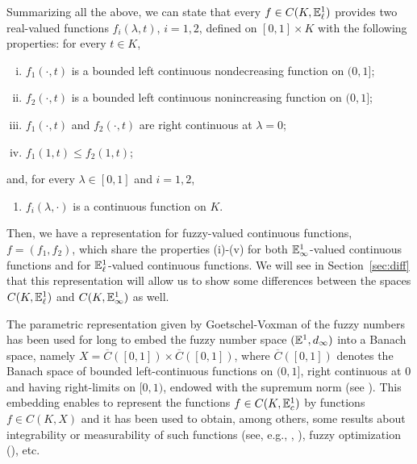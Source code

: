 \documentclass{amsart}
\newcommand{\R}{{\mathbb{R}}}
\newcommand{\fn}{\mathbb{E}\sp{1}}
\begin{document}
 Summarizing all the above,  we can state that  every $f\in C(K, \fn_{\ell})$
  provides two real-valued functions $f_i(\lambda,t)$, $i=1,2$, defined on $[0,1]\times K$ with the following properties:
 for every $t\in K$,

\begin{enumerate}[(i)]
 \item $f_1(\cdot,t)$ is a bounded left continuous nondecreasing function
on $\mathopen (0,1\mathclose]$;

\item  $f_2(\cdot,t)$ is a bounded left continuous nonincreasing function
on $\mathopen (0,1\mathclose]$;

\item $f_1(\cdot,t)$ and $f_2(\cdot,t)$ are right continuous at
$\lambda=0$;

\item $f_1(1,t)\leq f_2(1,t)$;
\end{enumerate}
and, for every $\lambda\in[0,1]$ and $i=1,2$,
\begin{enumerate}
\item[(v)] $f_i(\lambda,\cdot)$ is a continuous function on $K$.

\end{enumerate}

Then, we have a representation for fuzzy-valued continuous functions, $f=(f_1,f_2)$, which share the properties (i)-(v) for both
$\fn_{\infty}$-valued continuous functions and for $\fn_{\ell}$-valued continuous functions.
We will see in Section~\ref{sec:diff} that this representation will allow us to show some differences between the spaces $C(K, \fn_{\ell})$ and $ C(K,\fn_{\infty})$ as well.


The parametric representation given by Goetschel-Voxman of the fuzzy numbers has been used for long to embed the fuzzy number space $(\fn,d_{\infty})$ into a Banach space, namely $X=\overline{C}([0,1])\times \overline{C}([0,1])$, where $\overline{C}([0,1])$ denotes the Banach space of bounded left-continuous functions on $(0,1]$, right continuous at $0$ and having right-limits on $[0,1)$, endowed with the supremum norm (see \cite{WuMa:91}). This embedding enables to represent the functions $ f\in C(K, \fn_{c})$ by functions $f\in C(K,X)$ and it has been used to obtain, among others, some results about integrability or measurability of such functions
(see, e.g., \cite{WuMa:92-1}, \cite{WuMa:92}), fuzzy optimization (\cite{Wu:04}), etc.
\end{document}
